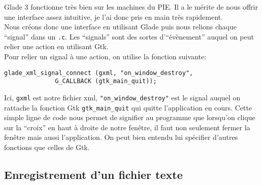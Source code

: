 \documentclass[a4paper,10pt]{report}
\begin{document}
Glade 3 fonctionne tr\`es bien sur les machines du PIE. Il a le m\'erite de nous offrir une interface assez intuitive, je l'ai donc pris en main tr\`es rapidement.\\
Nous cr\'eons donc une interface en utilisant Glade puis nous relions chaque ``signal'' dans un \texttt{.c}. Les ``signals'' sont des sortes d'``\'ev\`enement'' auquel on peut relier une action en utilisant Gtk.\\
Pour relier un signal \`a une action, on utilise la fonction suivante:

\begin{lstlisting}
glade_xml_signal_connect (gxml, "on_window_destroy",
			  G_CALLBACK (gtk_main_quit));
\end{lstlisting}

Ici, \verb!gxml! est notre fichier xml, \verb!"on_window_destroy"! est le signal auquel on rattache la fonction Gtk \verb!gtk_main_quit! qui quitte l'application en cours. Cette simple ligne de code nous permet de signifier au programme que lorsqu'on clique sur la ``croix'' en haut \`a droite de notre fen\^etre, il faut non seulement fermer la fen\^etre mais aussi l'application.
On peut bien entendu lui sp\'ecifier d'autres fonctions que celles de Gtk.

\subsection{Enregistrement d'un fichier texte} %
\label{sec:enregistrement_d_un_fichier_texte}
\end{document}
